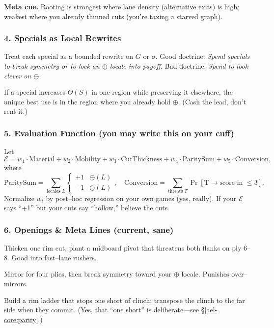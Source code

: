 \documentclass[11pt]{article}
\begin{document}
\begin{itemize}
\noindent\textbf{Meta cue.} Rooting is strongest where lane density (alternative exits) is high; weakest where you already thinned cuts (you’re taxing a starved graph).

\subsubsection{4. Specials as Local Rewrites}
\label{ael-core:specials}
Treat each special as a bounded rewrite on \(G\) or \(\sigma\). Good doctrine: \emph{Spend specials to break symmetry or to lock an \(\oplus\) locale into payoff.} Bad doctrine: \emph{Spend to look clever on \(\ominus\).} 

\begin{theorem}
If a special increases \(\Theta(S)\) in one region while preserving it elsewhere, the unique best use is in the region where you already hold \(\oplus\). (Cash the lead, don’t rent it.)
\end{theorem}

\subsubsection{5. Evaluation Function (you may write this on your cuff)}
Let 
\[
\mathcal{E} = w_1 \cdot \text{Material} + w_2 \cdot \text{Mobility} + w_3 \cdot \text{CutThickness} + w_4 \cdot \text{ParitySum} + w_5 \cdot \text{Conversion},
\]
where
\[
\text{ParitySum}=\sum_{\text{locales }L} \begin{cases}+1 & \oplus(L)\\ -1 & \ominus(L)\end{cases}, \quad
\text{Conversion}=\sum_{\text{threats }T}\Pr[\text{T}\to\text{score in }\le 3].
\]
Normalize \(w_i\) by post–hoc regression on your own games (yes, really). If your \(\mathcal{E}\) says “+1” but your cuts say “hollow,” believe the cuts.

\subsubsection{6. Openings \& Meta Lines (current, sane)}
\begin{description}\setlength\itemsep{0.35em}
  \item[\textit{Cage \& Pivot.}] Thicken one rim cut, plant a midboard pivot that threatens both flanks on ply 6–8. Good into fast–lane rushers.
  \item[\textit{Mirror–Then–Shiver.}] Mirror for four plies, then break symmetry toward your \(\oplus\) locale. Punishes over–mirrors.
  \item[\textit{Ladder–to–Ladder.}] Build a rim ladder that stops one short of clinch; transpose the clinch to the far side when they commit. (Yes, that “one short” is deliberate—see \S\ref{ael-core:parity}.)
\end{description}


\end{itemize}
\end{document}
